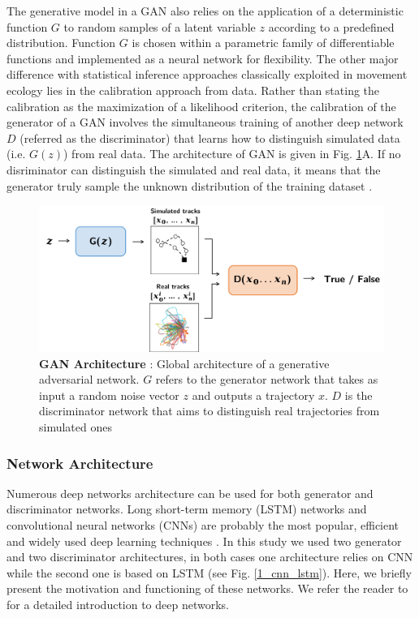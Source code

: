 \documentclass{article}
\begin{document}
The generative model in a GAN also relies on the application of a deterministic function $G$ to random samples of a latent variable $z$ according to a predefined distribution. Function $G$ is chosen within a parametric family of differentiable functions and implemented as a neural network for flexibility. The other major difference with statistical inference approaches classically exploited in movement ecology lies in the calibration approach from data. Rather than stating the calibration as the maximization of a likelihood criterion, the calibration of the generator of a GAN involves the simultaneous training of another deep network $D$ (referred as the discriminator) that learns how to distinguish simulated data (i.e. $G(z)$) from real data. The architecture of GAN is given in Fig. \ref{1_gan_architecture}A. If no disriminator can distinguish the simulated and real data, it means that the generator truly sample the unknown distribution of the training dataset \citep{goodfellow_generative_2014}.

\begin{figure}[h]
  \centering
  \includegraphics[scale=0.4]{1_gan_architecture.png}
  \caption{\textbf{GAN Architecture} : Global architecture of a generative adversarial network. $G$ refers to the generator network that takes as input a random noise vector $z$ and outputs a trajectory $x$. $D$ is the discriminator network that aims to distinguish real trajectories from simulated ones}
  \label{1_gan_architecture}
\end{figure}

\subsubsection{Network Architecture}
Numerous deep networks architecture can be used for both generator and discriminator networks. Long short-term memory (LSTM) networks and convolutional neural networks (CNNs) are probably the most popular, efficient and widely used deep learning techniques \citep{alom_state---art_2019}. In this study we used two generator and two discriminator architectures, in both cases one architecture relies on CNN while the second one is based on LSTM (see Fig. \ref{1_cnn_lstm}). Here, we briefly present the motivation and functioning of these networks. We refer the reader to \cite{christin_applications_2019} for a detailed introduction to deep networks.
\end{document}
